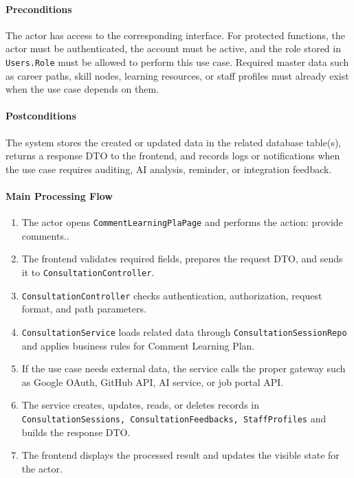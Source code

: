 \paragraph{Preconditions}

The actor has access to the corresponding interface. For protected functions, the actor must be authenticated, the account must be active, and the role stored in \texttt{Users.Role} must be allowed to perform this use case. Required master data such as career paths, skill nodes, learning resources, or staff profiles must already exist when the use case depends on them.

\paragraph{Postconditions}

The system stores the created or updated data in the related database table(s), returns a response DTO to the frontend, and records logs or notifications when the use case requires auditing, AI analysis, reminder, or integration feedback.

\paragraph{Main Processing Flow}

\begin{enumerate}
    \item The actor opens \texttt{CommentLearningPlaPage} and performs the action: provide comments..
    \item The frontend validates required fields, prepares the request DTO, and sends it to \texttt{ConsultationController}.
    \item \texttt{ConsultationController} checks authentication, authorization, request format, and path parameters.
    \item \texttt{ConsultationService} loads related data through \texttt{ConsultationSessionRepo} and applies business rules for Comment Learning Plan.
    \item If the use case needs external data, the service calls the proper gateway such as Google OAuth, GitHub API, AI service, or job portal API.
    \item The service creates, updates, reads, or deletes records in \texttt{ConsultationSessions, ConsultationFeedbacks, StaffProfiles} and builds the response DTO.
    \item The frontend displays the processed result and updates the visible state for the actor.
\end{enumerate}

